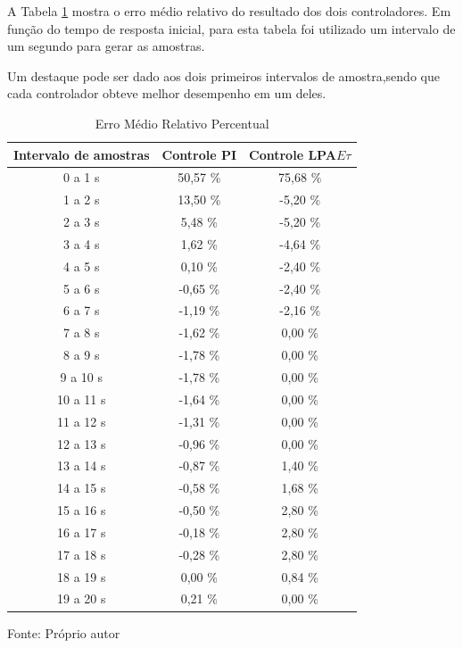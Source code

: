 A Tabela \ref{tab:resultadoComparaErros}
mostra o erro médio relativo do
resultado dos dois controladores.
Em função do tempo de resposta
inicial, para esta tabela foi utilizado um intervalo de um segundo para gerar as amostras.

Um destaque pode ser dado aos dois primeiros intervalos de amostra,sendo que cada controlador obteve melhor desempenho em um deles.




\begin{table}[h]
\centering
\caption{Erro Médio Relativo Percentual }
\label{tab:resultadoComparaErros}


\begin{tabular}{c|c|c}
\hline
Intervalo de amostras  &  Controle PI &
Controle LPA$E\tau$ \\ \hline
\hline
 0 a  1 s & 50,57 \% &  75,68 \% \\ \hline
 1 a  2 s & 13,50 \% &  -5,20 \% \\ \hline
 2 a  3 s &  5,48 \% &  -5,20 \% \\ \hline
 3 a  4 s &  1,62 \% &  -4,64 \% \\ \hline
 4 a  5 s &  0,10 \% &  -2,40 \% \\ \hline
 5 a  6 s & -0,65 \% &  -2,40 \% \\ \hline
 6 a  7 s & -1,19 \% &  -2,16 \% \\ \hline
 7 a  8 s & -1,62 \% &   0,00 \% \\ \hline
 8 a  9 s & -1,78 \% &   0,00 \% \\ \hline
 9 a 10 s & -1,78 \% &   0,00 \% \\ \hline
10 a 11 s & -1,64 \% &   0,00 \% \\ \hline
11 a 12 s & -1,31 \% &   0,00 \% \\ \hline
12 a 13 s & -0,96 \% &   0,00 \% \\ \hline
13 a 14 s & -0,87 \% &   1,40 \% \\ \hline
14 a 15 s & -0,58 \% &   1,68 \% \\ \hline
15 a 16 s & -0,50 \% &   2,80 \% \\ \hline
16 a 17 s & -0,18 \% &   2,80 \% \\ \hline
17 a 18 s & -0,28 \% &   2,80 \% \\ \hline
18 a 19 s &  0,00 \% &   0,84 \% \\ \hline
19 a 20 s &  0,21 \% &   0,00 \% \\ \hline

\end{tabular}

{\vspace{0.2cm} \small Fonte: Próprio autor}
\end{table}




